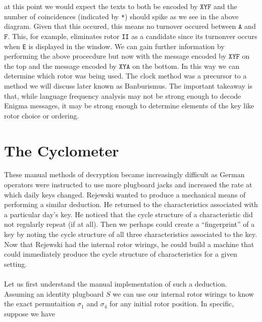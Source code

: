 at this point we would expect the texts to both be encoded by
$\texttt{XYF}$ and the number of coincidences (indicated by
\texttt{*}) should spike as we see in the above diagram. Given that this occured, this means no turnover occured between $\texttt{A}$ and
$\texttt{F}$. This, for example, eliminates rotor \texttt{II} as a
candidate since its turnonver occurs when \texttt{E} is displayed in
the window. We can gain further information by performing the above
procecdure but now with the message encoded by $\texttt{XYF}$ on the
top and the message encoded by $\texttt{XYA}$ on the bottom. In this
way we can determine which rotor was being used. The clock method was
a precursor to a method we will discuss later known as Banburismus.
The important takeaway is that, while language frequency analysis may not be
strong enough to decode Enigma messages, it may be strong enough to
determine elements of the key like rotor choice or ordering.

\section{The Cyclometer}

These manual methods of decryption became increasingly difficult as
German operators were instructed to use more plugboard jacks and
increased the rate at which daily keys changed. Rejewski wanted to
produce a mechanical means of performing a similar deduction. He
returned to the characteristics associated with a particular day's
key. He noticed that the cycle structure of a characteristic did not
regularly repeat (if at all). Then we perhaps could create a
``fingerprint'' of a key by noting the cycle structure of all three
characteristics associated to the key. Now that Rejewski had the
internal rotor wirings, he could build a machine that could
immediately produce the cycle structure of characteristics for a given setting.
\\\\Let us first understand the manual implementation of such a
deduction. Assuming an identity plugboard $S$ we can use our internal
rotor wirings to know the exact permutaition $\sigma_1$ and
$\sigma_4$ for any initial rotor position. In specific, suppose we have

